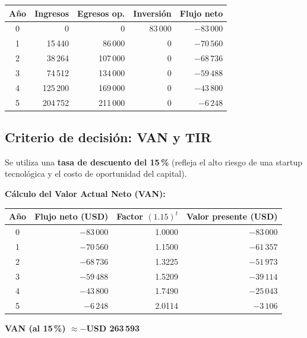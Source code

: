 \begin{table}[ht]
  \centering
  \begin{tabular}{c r r r r}
    \toprule
    \textbf{Año} & \textbf{Ingresos} & \textbf{Egresos op.} & \textbf{Inversión} & \textbf{Flujo neto} \\
    \midrule
    0 & 0        & 0        & 83\,000 & \textbf{$-83\,000$} \\
    1 & 15\,440  & 86\,000  & 0       & \textbf{$-70\,560$} \\
    2 & 38\,264  & 107\,000 & 0       & \textbf{$-68\,736$} \\
    3 & 74\,512  & 134\,000 & 0       & \textbf{$-59\,488$} \\
    4 & 125\,200 & 169\,000 & 0       & \textbf{$-43\,800$} \\
    5 & 204\,752 & 211\,000 & 0       & \textbf{$-6\,248$}  \\
    \bottomrule
  \end{tabular}
\end{table}

\subsection{Criterio de decisión: VAN y TIR}
Se utiliza una \textbf{tasa de descuento del 15\,\%} (refleja el alto riesgo de una
startup tecnológica y el costo de oportunidad del capital).

\noindent\textbf{Cálculo del Valor Actual Neto (VAN):}

\begin{table}[ht]
  \centering
  \begin{tabular}{c r r r}
    \toprule
    \textbf{Año} & \textbf{Flujo neto (USD)} & \textbf{Factor $(1.15)^t$} & \textbf{Valor presente (USD)} \\
    \midrule
    0 & $-83\,000$ & 1.0000 & $-83\,000$ \\
    1 & $-70\,560$ & 1.1500 & $-61\,357$ \\
    2 & $-68\,736$ & 1.3225 & $-51\,973$ \\
    3 & $-59\,488$ & 1.5209 & $-39\,114$ \\
    4 & $-43\,800$ & 1.7490 & $-25\,043$ \\
    5 & $-6\,248$  & 2.0114 & $-3\,106$  \\
    \bottomrule
  \end{tabular}
\end{table}

\noindent\textbf{VAN (al 15\,\%) $\approx -$USD 263\,593}

